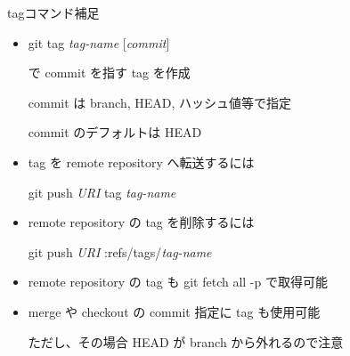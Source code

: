 \begin{frame}[t]{tag}{コマンド補足}

  \begin{itemize}
  \item git tag \textit{tag-name} [\textit{commit}]

    で commit を指す tag を作成

    commit は branch, HEAD, ハッシュ値等で指定

    commit のデフォルトは HEAD
    \vspace{2ex}

  \item tag を remote repository へ転送するには

    git push \textit{URI} tag \textit{tag-name}
    \vspace{2ex}

  \item remote repository の tag を削除するには

    git push \textit{URI} :refs/tags/\textit{tag-name}
    \vspace{2ex}

  \item remote repository の tag も git fetch {\dhyphen}all -p で取得可能
    \vspace{2ex}

  \item merge や checkout の commit 指定に tag も使用可能

    ただし、その場合 HEAD が branch から外れるので注意
  \end{itemize}

\end{frame}
